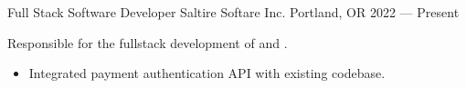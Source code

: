 \showoff
{Full Stack Software Developer}
{Saltire Softare Inc.}
{Portland, OR}
{2022 --- Present}

Responsible for the fullstack development of  and .

\begin{itemize}[label=$\triangleright$]
    \item Integrated payment authentication API with existing codebase.
\end{itemize}
